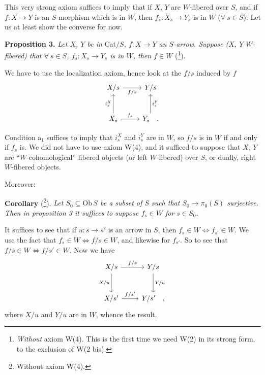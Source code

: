 This very strong axiom suffices to imply that if $X$, $Y$ are $W$-fibered over $S$, and if $f : X \longrightarrow Y$ is an $S$-morphism which is in $W$, then $f_s : X_s \longrightarrow Y_s$ is in $W$ ($\forall\ s \in S$). Let us at least show the converse for now.


\textbf{Proposition 3.} \textit{Let $X$, $Y$ be in} Cat$/S$\textit{, $f : X \longrightarrow Y$ an $S$-arrow. Suppose ($X$, $Y$ $W$-fibered) that $\forall\ s \in S$, $f_s : X_s \longrightarrow Y_s$ is in $W$, then $f \in W$} (\footnote[8]{\textit{Without} axiom W(4). This is the first time we need W(2) in its strong form, to the exclusion of W(2 bis).}).

We have to use the localization axiom, hence look at the $f/s$ induced by $f$
\[
\begin{tikzcd}[row sep=large]
X/s \arrow[r, "f/s"'] & Y/s \\
X_s \arrow[u, "i_s^X"] \arrow[r, "f_s"] & Y_s \arrow[u, "i_s^Y"'] \quad .
\end{tikzcd}
\]

Condition a$_1$ suffices to imply that $i_s^X$ and $i_s^Y$ are in $W$, so $f/s$ is in $W$ if and only if $f_s$ is. We did not have to use axiom W(4), and it sufficed to suppose that $X$, $Y$ are ``$W$-cohomological'' fibered objects (or left $W$-fibered) over $S$, or dually, right $W$-fibered objects.

Moreover:

\textbf{Corollary} (\footnote[9]{Without axiom W(4).}). \textit{Let $S_0 \subseteq \mathrm{Ob}\,S$ be a subset of $S$ such that $S_0 \longrightarrow \pi_0(S)$ surjective. Then in proposition 3 it suffices to suppose $f_s \in W$ for $s \in S_0$.}

It suffices to see that if $u : s \longrightarrow s'$ is an arrow in $S$, then $f_s \in W \iff f_{s'} \in W$. We use the fact that $f_s \in W \iff f/s \in W$, and likewise for $f_{s'}$. So to see that $f/s \in W \iff f/s' \in W$. Now we have
\[
\begin{tikzcd}[row sep=large]
X/s \arrow[r, "f/s"] \arrow[d, "X/u"'] & Y/s \arrow[d, "Y/u"] \\
X/s' \arrow[r, "f/s'"] & Y/s' \quad ,
\end{tikzcd}
\]
where $X/u$ and $Y/u$ are in $W$, whence the result.

